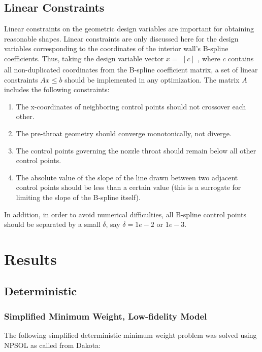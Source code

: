 \documentclass{article}
\newcommand{\irow}[1]{%
  \begin{smallmatrix}[#1]\end{smallmatrix}%
}
\begin{document}
\subsection{Linear Constraints}
\label{sec:linearConstraints}

Linear constraints on the geometric design variables are important for obtaining reasonable shapes. Linear constraints are only discussed here for the design variables corresponding to the coordinates of the interior wall's B-spline coefficients. Thus, taking the design variable vector $x = \irow{ c }$, where $c$ contains all non-duplicated coordinates from the B-spline coefficient matrix, a set of linear constraints $A x \leq b$ should be implemented in any optimization. The matrix $A$ includes the following constraints:

\begin{enumerate}
\item The x-coordinates of neighboring control points should not crossover each other. 
\item The pre-throat geometry should converge monotonically, not diverge.
\item The control points governing the nozzle throat should remain below all other control points.
\item The absolute value of the slope of the line drawn between two adjacent control points should be less than a certain value (this is a surrogate for limiting the slope of the B-spline itself). 
\end{enumerate}

In addition, in order to avoid numerical difficulties, all B-spline control points should be separated by a small $\delta$, say $\delta = 1e-2 \textrm{ or } 1e-3$.

\section{Results}

\subsection{Deterministic}

\subsubsection{Simplified Minimum Weight, Low-fidelity Model}

The following simplified deterministic minimum weight problem was solved using NPSOL as called from Dakota:
\end{document}

